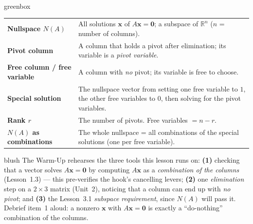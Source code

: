 \documentclass[10pt]{article}
\newcommand{\xx}{\mathbf{x}}
\newcommand{\zero}{\mathbf{0}}
\begin{document}
\begin{skillbox}{greenbox}
\renewcommand{\arraystretch}{1.3}
\begin{tabularx}{\linewidth}{@{}l X@{}}
\textbf{Nullspace $N(A)$} & All solutions $\xx$ of $A\xx=\zero$; a subspace of $\mathbb{R}^n$ ($n$ = number of columns). \\
\textbf{Pivot column} & A column that holds a pivot after elimination; its variable is a \emph{pivot variable}. \\
\textbf{Free column / free variable} & A column with \emph{no} pivot; its variable is free to choose. \\
\textbf{Special solution} & The nullspace vector from setting one free variable to $1$, the other free variables to $0$, then solving for the pivot variables. \\
\textbf{Rank $r$} & The number of pivots. Free variables $=n-r$. \\
\textbf{$N(A)$ as combinations} & The whole nullspace = all combinations of the special solutions (one per free variable). \\
\end{tabularx}
\end{skillbox}

\begin{fixedskillbox}{blush}
    The Warm-Up rehearses the three tools this lesson runs on:
    \textbf{(1)} checking that a vector solves $A\xx=\zero$ by computing $A\xx$ as a
    \emph{combination of the columns} (Lesson~1.3) --- this pre-verifies the hook's cancelling
    levers; \textbf{(2)} one \emph{elimination} step on a $2\times3$ matrix (Unit~2), noticing that a
    column can end up with \emph{no pivot}; and \textbf{(3)} the Lesson~3.1 \emph{subspace
    requirement}, since $N(A)$ will pass it. Debrief item~1 aloud: a nonzero $\xx$ with $A\xx=\zero$
    is exactly a ``do-nothing'' combination of the columns.
\end{fixedskillbox}
\end{document}
